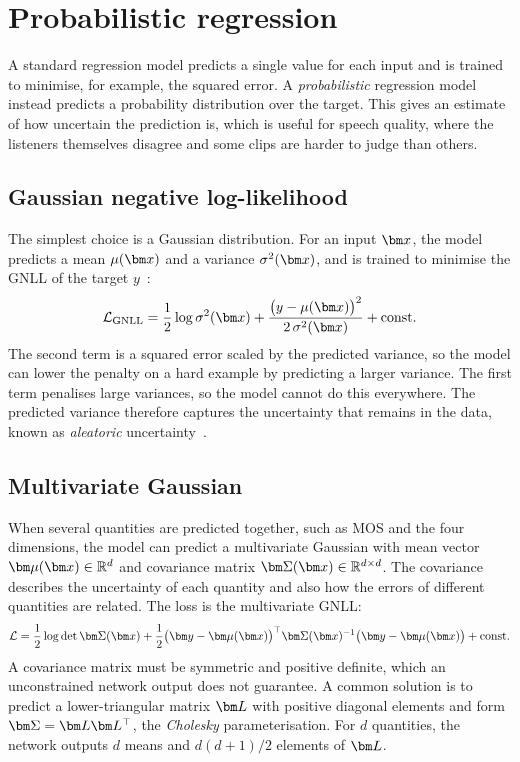 \documentclass[
english,                 %
bibtex,                  %
includeExtraAbstracts, %
]{kththesis}
\numberwithin{listing}{chapter}
\begin{document}
\section{Probabilistic regression}
\label{sec:probabilistic}

A standard regression model predicts a single value for each input and is trained to minimise, for example, the squared error. A \emph{probabilistic} regression model instead predicts a probability distribution over the target. This gives an estimate of how uncertain the prediction is, which is useful for speech quality, where the listeners themselves disagree and some clips are harder to judge than others.

\subsection{Gaussian negative log-likelihood}

The simplest choice is a Gaussian distribution. For an input $\vect{x}$, the model predicts a mean $\mu(\vect{x})$ and a variance $\sigma^2(\vect{x})$, and is trained to minimise the \gls{GNLL} of the target $y$~\cite{nix_weigend_1994}:
\begin{equation}
  \mathcal{L}_{\text{GNLL}} = \frac{1}{2}\log \sigma^2(\vect{x}) + \frac{\big(y - \mu(\vect{x})\big)^2}{2\,\sigma^2(\vect{x})} + \text{const.}
  \label{eq:gnll}
\end{equation}
The second term is a squared error scaled by the predicted variance, so the model can lower the penalty on a hard example by predicting a larger variance. The first term penalises large variances, so the model cannot do this everywhere. The predicted variance therefore captures the uncertainty that remains in the data, known as \emph{aleatoric} uncertainty~\cite{kendall_gal_2017}.

\subsection{Multivariate Gaussian}

When several quantities are predicted together, such as MOS and the four dimensions, the model can predict a multivariate Gaussian with mean vector $\vect{\mu}(\vect{x}) \in \mathbb{R}^d$ and covariance matrix $\vect{\Sigma}(\vect{x}) \in \mathbb{R}^{d \times d}$. The covariance describes the uncertainty of each quantity and also how the errors of different quantities are related. The loss is the multivariate GNLL:
\begin{equation}
  \mathcal{L} = \frac{1}{2}\log \det \vect{\Sigma}(\vect{x}) + \frac{1}{2}\big(\vect{y} - \vect{\mu}(\vect{x})\big)^{\top} \vect{\Sigma}(\vect{x})^{-1} \big(\vect{y} - \vect{\mu}(\vect{x})\big) + \text{const.}
  \label{eq:mvgnll}
\end{equation}
A covariance matrix must be symmetric and positive definite, which an unconstrained network output does not guarantee. A common solution is to predict a lower-triangular matrix $\vect{L}$ with positive diagonal elements and form $\vect{\Sigma} = \vect{L}\vect{L}^{\top}$, the \emph{Cholesky} parameterisation. For $d$ quantities, the network outputs $d$ means and $d(d+1)/2$ elements of $\vect{L}$.
\end{document}
